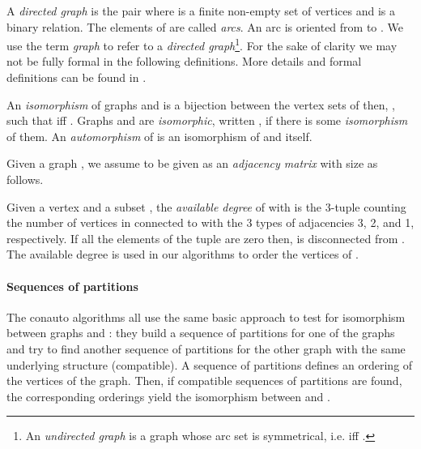 

A {\em directed graph}  is the pair  where  is a finite non-empty set of vertices and  is a binary
relation.
The elements of  are called {\em arcs}. An arc  is oriented from  to . 
We use the term {\em graph} to refer to a {\em directed graph}\footnote{An {\em undirected graph} is a graph whose arc set  is symmetrical, i.e.  iff .}.
For the sake of clarity we may not be fully formal in the following definitions. More details and formal definitions can be found in \cite{DBLP:conf/wea/Lopez-PresaA09,jllopez2009}.

An \emph{isomorphism} of graphs  and  is a bijection between the vertex sets
of then, , such that  iff .
Graphs  and  are {\em isomorphic}, written , if there is some
\emph{isomorphism} of them. An {\em automorphism} of  is an isomorphism of  and itself.

Given a graph , we assume  to be given as an {\em adjacency matrix}
 with size  as follows.

Given a vertex  and a subset , the \emph{available degree} of  with  is the 3-tuple  counting the number of vertices
in  connected to  with the 3 types of adjacencies 3, 2, and 1, respectively. If all the elements of the tuple are zero then,  is disconnected from . The available degree
is used in our algorithms to order the vertices of .





\paragraph{Sequences of partitions}

The conauto \cite{DBLP:conf/wea/Lopez-PresaA09,jllopez2009} algorithms all use the same basic approach to test for isomorphism between graphs  and : they build a sequence of partitions for one of the graphs and try to find another sequence of partitions for the other graph with the same underlying structure (compatible). A sequence of partitions defines an ordering of the vertices of the graph. Then, if compatible sequences of partitions are found, the corresponding orderings yield the isomorphism between  and .



